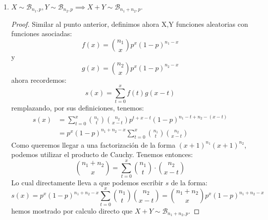 \documentclass[notitlepage]{article}
\theoremstyle{definition}
\theoremstyle{remark}
\begin{document}
\begin{enumerate}[A)]
\begin{enumerate}[1)]
\begin{proof}
					\[ s(x) = \sum_{t=0}^x f(t)g(x-t) \]
					Sabemos que para Poission las funciones son dadas por:
					\[ f(x) = \frac{e^{-\lambda}\lambda^x}{x!}  \]
					y 
					\[   g(x) = \frac{e^{-\lambda'}(\lambda')^x}{x!} \]
					Utilizando la primera formula, remplazando valores tenemos:
					\[ s(x) =  \sum_{t=0}^x \frac{e^{-\lambda}\lambda^t}{t!}\frac{e^{-\lambda'}(\lambda')^{x-t}}{(x-t)!}  \]
					reorganizando:
					\[ s(x) = e^{-(\lambda+\lambda')}\sum_{t=0}^x\frac{\lambda^t(\lambda')^{x-t}}{t!(x-t)!} \]
					Por lo tanto:
					\[ s(x) = e^{-(\lambda+\lambda')}\sum_{t=0}^x\frac{\lambda^t(\lambda')^{x-t}}{t!(x-t)!} \]
					Identificamos en esta expresión el coeficiente binomial, y tenemos que:
					\[ s(x)= e^{-(\lambda+\lambda')}\sum_{t=0}^x \frac{1}{x!}\binom{x}{t}\lambda^t(\lambda')^{x-t} \]
					\[s(x) = \frac{e^{{-(\lambda+\lambda')}}}{x!}\sum_{t=0}^x \binom{x}{t}\lambda^t(\lambda')^{x-t} \]
					como $ x $ es entero, identificamos que:
					\[ (\lambda + \lambda')^x =  \sum_{t=0}^x \binom{x}{t}\lambda^t(\lambda')^{x-t}  \]
					y finalmente:
					\[ s(x) =  \frac{e^{-(\lambda+\lambda')}(\lambda+\lambda')^x}{x!}  \]
				\end{proof}
				\item $X \sim \mathcal{B}_{n_1,p}, Y \sim \mathcal{B}_{n_2,p} \implies X+Y \sim \mathcal{B}_{n_1+n_2,p}.$
				\begin{proof}
					Similar al punto anterior, definimos ahora X,Y funciones aleatorias con funciones asociadas:
					\[ f(x) =  \binom{n_1}{x}p^x(1-p)^{n_1-x} \]
					y \[ g(x) = \binom{n_2}{x}p^x(1-p)^{n_2-x} \]
					ahora recordemos:
					\[  s(x) = \sum_{t=0}^x f(t)g(x-t) \]
					remplazando, por sus definiciones, tenemos:
					\begin{align*}
					s(x) &= \sum_{t=0}^x \binom{n_1}{t}\binom{n_2}{x-t}p^{t+x-t}(1-p)^{n_1-t+n_2-(x-t)}  \\
					&= p^{x}(1-p)^{n_1+n_2-x}  \sum_{t=0}^x \binom{n_1}{t}\binom{n_2}{x-t}
					\end{align*} 
					Como queremos llegar a una factorización de la forma $ (x+1)^{n_1} (x+1)^{n_2}$, podemos utilizar el producto de Cauchy. Tenemos entonces:
					\[ \binom{n_1 + n_2}{x} = \sum_{t=0}^x \binom{n_1}{t} \cdot \binom{n_2}{x-t} \]
					Lo cual directamente lleva a que podemos escribir $ s $ de la forma:
					\[ s(x) = p^{x}(1-p)^{n_1+n_2-x}  \sum_{t=0}^x \binom{n_1}{t}\binom{n_2}{x-t} = \binom{n_1+n_2}{x} p^{x}(1-p)^{n_1+n_2-x} \]
					hemos mostrado por calculo directo que $  X+Y \sim \mathcal{B}_{n_1+n_2,p}.$ 
				\end{proof}
				\end{enumerate} 
	
	\end{enumerate}
	
\end{document}

